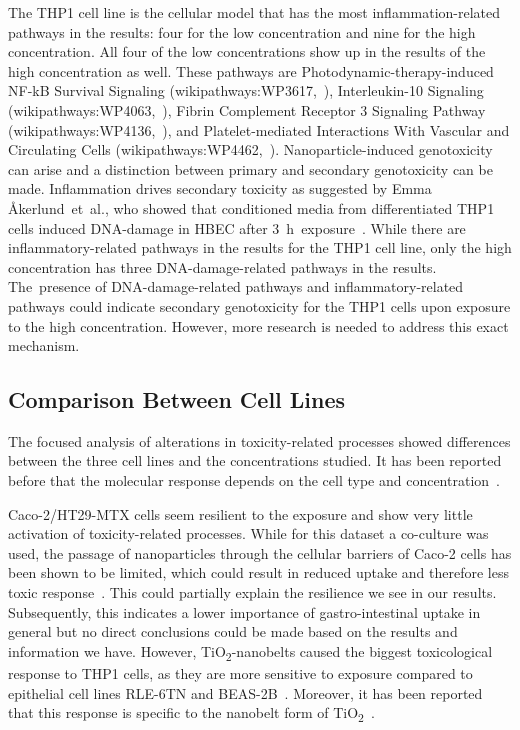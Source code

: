 \documentclass[ijms,article,accept,moreauthors,pdftex]{Definitions/mdpi}
\begin{document}
\begin{paracol}{2}
{The THP1 cell line is the cellular model that has the most inflammation-related pathways in the results: four for the low concentration and nine for the high concentration. All four of the low concentrations show up in the results of the high concentration as well. These pathways are Photodynamic-therapy-induced NF-kB Survival Signaling} (wikipathways:WP3617,~\cite{WP3617}), {Interleukin-10 Signaling} (wikipathways:WP4063,~\cite{WP4063}), {Fibrin Complement Receptor 3 Signaling Pathway} (wikipathways:WP4136,~\cite{WP4136}), {and Platelet-mediated Interactions With Vascular and Circulating Cells} (wikipathways:WP4462,~\cite{WP4462}).
{Nanoparticle-induced genotoxicity can arise and a distinction between primary and secondary genotoxicity can be made. Inflammation drives secondary toxicity as suggested by} Emma Åkerlund~et~al., {who showed that conditioned media from differentiated THP1 cells induced DNA-damage in HBEC after} 3~h~exposure~\cite{Akerlund2019}. {While there are inflammatory-related pathways in the results for the THP1 cell line, only the high concentration has three DNA-damage-related pathways in the results. The~presence of DNA-damage-related pathways and inflammatory-related pathways could indicate secondary genotoxicity for the THP1 cells upon exposure to the high concentration. However, more research is needed to address this exact mechanism.} 

\subsection{Comparison Between Cell Lines}
The focused analysis of alterations in toxicity-related processes showed differences between the three cell lines and the concentrations studied. It has been reported before that the molecular response depends on the cell type and concentration~\cite{TadaOikawa2016}. 

{Caco-2/HT29-MTX} cells seem resilient to the exposure and show very little activation of toxicity-related processes. {While for this dataset a co-culture was used,} the passage of nanoparticles through the cellular barriers of {Caco-2} cells has been shown to be limited, which could result in reduced uptake and therefore less toxic response~\cite{Ye2017}. {This could partially explain the resilience we see in our results.} Subsequently, this indicates a lower importance of gastro-intestinal uptake in general {but no direct conclusions could be made based on the results and information we have.} However, TiO\textsubscript{2}-nanobelts caused the biggest toxicological response to THP1 cells, as they are more sensitive to exposure compared to epithelial cell lines RLE-6TN and BEAS-2B~\cite{Xia2013}. Moreover, it has been reported that this response is specific to the nanobelt form of TiO\textsubscript{2}~\cite{Xia2013}.


\end{paracol}
\end{document}
